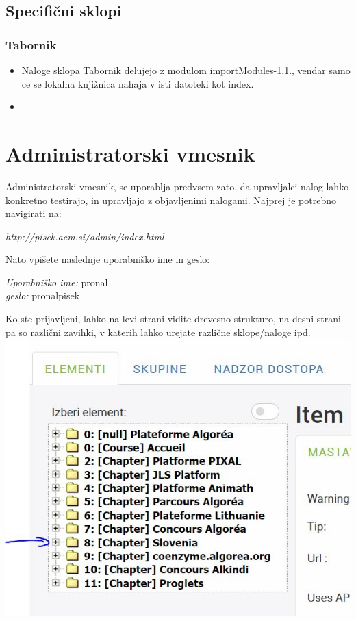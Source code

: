 \documentclass[11pt]{article} %
\begin{document}
\pagebreak

\subsection{Specifični sklopi}

\subsubsection{Tabornik}
\begin{itemize}
\item Naloge sklopa Tabornik delujejo z modulom importModules-1.1., vendar samo ce se lokalna knjižnica nahaja v isti datoteki kot index.
\item
\end{itemize}
\section{Administratorski vmesnik}

Administratorski vmesnik, se uporablja predvsem zato, da upravljalci nalog lahko konkretno testirajo, in upravljajo z objavljenimi nalogami.
Najprej je potrebno navigirati na:\\
\begin{center}
\textit{http://pisek.acm.si/admin/index.html}
\end{center}
Nato vpišete naslednje uporabniško ime in geslo:
\begin{center}
\textit{Uporabniško ime: } pronal\\
\textit{geslo: } pronal\textunderscore pisek\\
\end{center}
Ko ste prijavljeni, lahko na levi strani vidite drevesno strukturo, na desni strani pa so različni zavihki, v katerih lahko urejate različne sklope/naloge ipd.\\
\includegraphics[scale=0.8]{admin_drevo}\\
\end{document}
